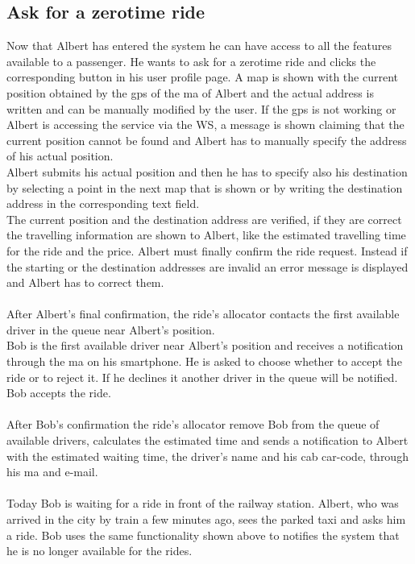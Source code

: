 \subsection{Ask for a zerotime ride}
Now that Albert has entered the system he can have access to all the features available to a \gls{passenger}. He wants to ask for a zerotime ride and clicks the corresponding button in his user profile page. A \gls{map} is shown with the current position obtained by the \gls{gps} of the \gls{ma} of Albert and the actual address is written and can be manually modified by the user. If the \gls{gps} is not working or Albert is accessing the service via the WS, a message is shown claiming that the current position cannot be found and Albert has to manually specify the address of his actual position.\\
Albert submits his actual position and then he has to specify also his destination by selecting a point in the next \gls{map} that is shown or by writing the destination address in the corresponding text field.\\
The current position and the destination address are verified, if they are correct the travelling information are shown to Albert, like the estimated travelling time for the ride and the price. Albert must finally confirm the ride request. Instead if the starting or the destination addresses are invalid an error message is displayed and Albert has to correct them.\\
\\
After Albert's final confirmation, the ride's allocator contacts the first available \gls{driver} in the queue near Albert's position.\\
Bob is the first available \gls{driver} near Albert's position and receives a notification through the \gls{ma} on his smartphone. He is asked to choose whether to accept the ride or to reject it. If he declines it another \gls{driver} in the queue will be notified.\\
Bob accepts the ride.\\
\\
After Bob's confirmation the ride's allocator remove Bob from the queue of available \glspl{driver}, calculates the estimated time and sends a notification to Albert with the estimated waiting time, the \gls{driver}'s name and his cab car-code, through his \gls{ma} and e-mail.\\
\\
Today Bob is waiting for a ride in front of the railway station. Albert, who was arrived in the city by train a few minutes ago, sees the parked taxi and asks him a ride. Bob uses the same functionality shown above to notifies the system that he is no longer available for the rides.

